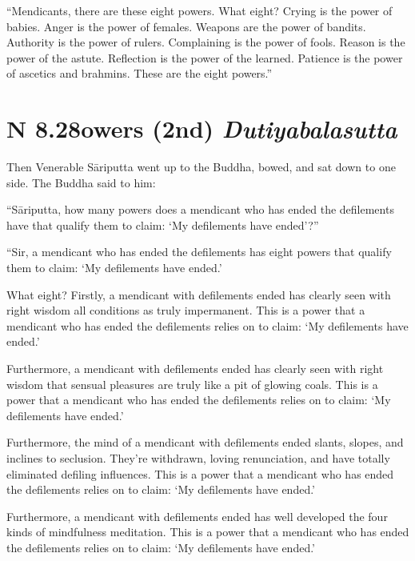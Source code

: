 \documentclass[12pt,openany]{book}%
\newcommand*{\suttatitleacronym}[1]{\smaller[2]{#1}\vspace*{.3em}}
\newcommand*{\suttatitletranslation}[1]{\linebreak{#1}}
\newcommand*{\suttatitleroot}[1]{\linebreak\smaller[2]\itshape{#1}}
\newcommand*{\tocacronym}[1]{\hspace*{-3.3em}{#1}\quad}
\newcommand*{\toctranslation}[1]{#1}
\newcommand*{\tocroot}[1]{(\textit{#1})}
\begin{document}
“Mendicants, there are these eight powers. What eight? Crying is the power of babies. Anger is the power of females. Weapons are the power of bandits. Authority is the power of rulers. Complaining is the power of fools. Reason is the power of the astute. Reflection is the power of the learned. Patience is the power of ascetics and brahmins. These are the eight powers.” 

%
\section*{{\suttatitleacronym AN 8.28}{\suttatitletranslation Powers (2nd) }{\suttatitleroot Dutiyabalasutta}}
\addcontentsline{toc}{section}{\tocacronym{AN 8.28} \toctranslation{Powers (2nd) } \tocroot{Dutiyabalasutta}}

Then Venerable \textsanskrit{Sāriputta} went up to the Buddha, bowed, and sat down to one side. The Buddha said to him: 

“\textsanskrit{Sāriputta}, how many powers does a mendicant who has ended the defilements have that qualify them to claim: ‘My defilements have ended’?” 

“Sir, a mendicant who has ended the defilements has eight powers that qualify them to claim: ‘My defilements have ended.’ 

What eight? Firstly, a mendicant with defilements ended has clearly seen with right wisdom all conditions as truly impermanent. This is a power that a mendicant who has ended the defilements relies on to claim: ‘My defilements have ended.’ 

Furthermore, a mendicant with defilements ended has clearly seen with right wisdom that sensual pleasures are truly like a pit of glowing coals. This is a power that a mendicant who has ended the defilements relies on to claim: ‘My defilements have ended.’ 

Furthermore, the mind of a mendicant with defilements ended slants, slopes, and inclines to seclusion. They’re withdrawn, loving renunciation, and have totally eliminated defiling influences. This is a power that a mendicant who has ended the defilements relies on to claim: ‘My defilements have ended.’ 

Furthermore, a mendicant with defilements ended has well developed the four kinds of mindfulness meditation. This is a power that a mendicant who has ended the defilements relies on to claim: ‘My defilements have ended.’ 
\end{document}
